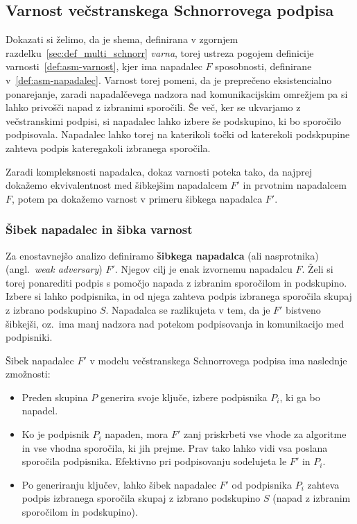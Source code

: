 \documentclass[isrm2, tisk]{fmfdelo}
\begin{document}
\subsection{Varnost večstranskega Schnorrovega podpisa}
\label{sec:proof_multi_schnorr}
Dokazati si želimo, da je shema, definirana v zgornjem razdelku~\ref{sec:def_multi_schnorr} \textit{varna},
torej ustreza pogojem definicije varnosti~\ref{def:asm-varnost}, kjer ima napadalec $F$ sposobnosti,
definirane v~\ref{def:asm-napadalec}. Varnost torej pomeni, da je preprečeno eksistencialno ponarejanje,
zaradi napadalčevega nadzora nad komunikacijskim omrežjem pa si lahko privošči napad z izbranimi sporočili.
Še več, ker se ukvarjamo z večstranskimi podpisi, si napadalec lahko izbere še podskupino, ki bo 
sporočilo podpisovala. Napadalec lahko torej na katerikoli točki od katerekoli podskpupine zahteva
podpis kateregakoli izbranega sporočila.

Zaradi kompleksnosti napadalca, dokaz varnosti poteka tako, da najprej dokažemo ekvivalentnost med
šibkejšim napadalcem $F'$ in prvotnim napadalcem $F$, potem pa dokažemo varnost v primeru šibkega
napadalca $F'$.

\subsubsection{Šibek napadalec in šibka varnost}
Za enostavnejšo analizo definiramo \textbf{šibkega napadalca} (ali nasprotnika) (angl.\ 
\textit{weak adversary}) $F'$. Njegov cilj je enak izvornemu napadalcu $F$. Želi si torej ponarediti podpis
s pomočjo napada z izbranim sporočilom in podskupino. Izbere si lahko podpisnika, in od njega
zahteva podpis izbranega sporočila skupaj z izbrano podskupino $S$. Napadalca se razlikujeta v tem,
da je $F'$ bistveno šibkejši, oz.\ ima manj nadzora nad potekom podpisovanja in komunikacijo med
podpisniki.

\begin{definicija}
\label{def:asm-sibek-napadalec}
    Šibek napadalec $F'$ v modelu večstranskega Schnorrovega podpisa ima naslednje zmožnosti:
    \begin{itemize}
        \item Preden skupina $P$ generira svoje ključe, izbere podpisnika $P_i$, ki ga bo napadel.
        \item Ko je podpisnik $P_i$ napaden, mora $F'$ zanj priskrbeti vse vhode za algoritme in
            vse vhodna sporočila, ki jih prejme. Prav tako lahko vidi vsa poslana sporočila
            podpisnika. Efektivno pri podpisovanju sodelujeta le $F'$ in $P_i$.
        \item Po generiranju ključev, lahko šibek napadalec $F'$ od podpisnika $P_i$ zahteva podpis
            izbranega sporočila skupaj z izbrano podskupino $S$ (napad z izbranim sporočilom in
            podskupino).
    \end{itemize}
\end{definicija}
\end{document}

